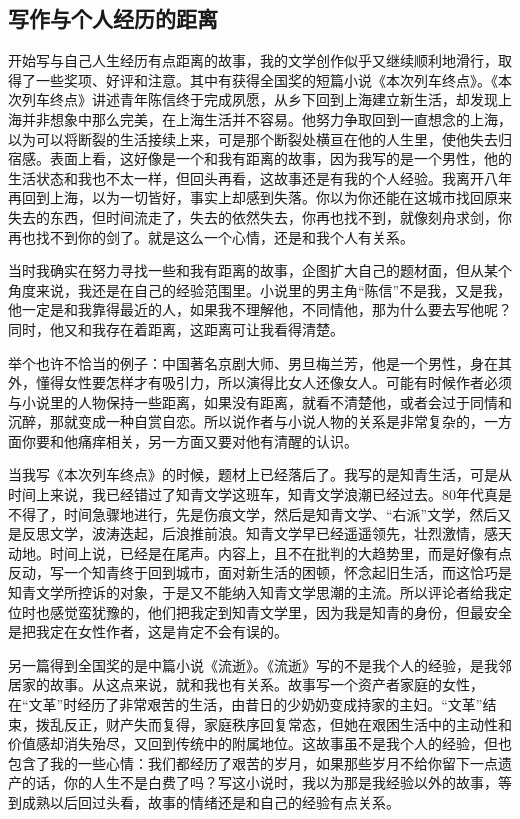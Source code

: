 \documentclass[fontset=fandol,12pt,a5paper]{ctexbook}
\begin{document}
\subsection{写作与个人经历的距离}
开始写与自己人生经历有点距离的故事，我的文学创作似乎又继续顺利地滑行，取得了一些奖项、好评和注意。其中有获得全国奖的短篇小说《本次列车终点》。《本次列车终点》讲述青年陈信终于完成夙愿，从乡下回到上海建立新生活，却发现上海并非想象中那么完美，在上海生活并不容易。他努力争取回到一直想念的上海，以为可以将断裂的生活接续上来，可是那个断裂处横亘在他的人生里，使他失去归宿感。表面上看，这好像是一个和我有距离的故事，因为我写的是一个男性，他的生活状态和我也不太一样，但回头再看，这故事还是有我的个人经验。我离开八年再回到上海，以为一切皆好，事实上却感到失落。你以为你还能在这城市找回原来失去的东西，但时间流走了，失去的依然失去，你再也找不到，就像刻舟求剑，你再也找不到你的剑了。就是这么一个心情，还是和我个人有关系。

当时我确实在努力寻找一些和我有距离的故事，企图扩大自己的题材面，但从某个角度来说，我还是在自己的经验范围里。小说里的男主角“陈信”不是我，又是我，他一定是和我靠得最近的人，如果我不理解他，不同情他，那为什么要去写他呢？同时，他又和我存在着距离，这距离可让我看得清楚。

举个也许不恰当的例子：中国著名京剧大师、男旦梅兰芳，他是一个男性，身在其外，懂得女性要怎样才有吸引力，所以演得比女人还像女人。可能有时候作者必须与小说里的人物保持一些距离，如果没有距离，就看不清楚他，或者会过于同情和沉醉，那就变成一种自赏自恋。所以说作者与小说人物的关系是非常复杂的，一方面你要和他痛痒相关，另一方面又要对他有清醒的认识。

当我写《本次列车终点》的时候，题材上已经落后了。我写的是知青生活，可是从时间上来说，我已经错过了知青文学这班车，知青文学浪潮已经过去。80年代真是不得了，时间急骤地进行，先是伤痕文学，然后是知青文学、“右派”文学，然后又是反思文学，波涛迭起，后浪推前浪。知青文学早已经遥遥领先，壮烈激情，感天动地。时间上说，已经是在尾声。内容上，且不在批判的大趋势里，而是好像有点反动，写一个知青终于回到城市，面对新生活的困顿，怀念起旧生活，而这恰巧是知青文学所控诉的对象，于是又不能纳入知青文学思潮的主流。所以评论者给我定位时也感觉蛮犹豫的，他们把我定到知青文学里，因为我是知青的身份，但最安全是把我定在女性作者，这是肯定不会有误的。

另一篇得到全国奖的是中篇小说《流逝》。《流逝》写的不是我个人的经验，是我邻居家的故事。从这点来说，就和我也有关系。故事写一个资产者家庭的女性，在“文革”时经历了非常艰苦的生活，由昔日的少奶奶变成持家的主妇。“文革”结束，拨乱反正，财产失而复得，家庭秩序回复常态，但她在艰困生活中的主动性和价值感却消失殆尽，又回到传统中的附属地位。这故事虽不是我个人的经验，但也包含了我的一些心情：我们都经历了艰苦的岁月，如果那些岁月不给你留下一点遗产的话，你的人生不是白费了吗？写这小说时，我以为那是我经验以外的故事，等到成熟以后回过头看，故事的情绪还是和自己的经验有点关系。
\end{document}
